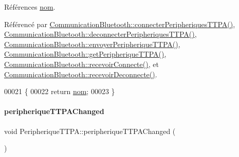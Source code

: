 Références \hyperlink{class_peripherique_t_t_p_a_afafe3566b4b5357819811218b9a4244f}{nom}.



Référencé par \hyperlink{class_communication_bluetooth_a321073d9dc26aad4b34ecf41a1dee8a4}{Communication\+Bluetooth\+::connecter\+Peripheriques\+T\+T\+P\+A()}, \hyperlink{class_communication_bluetooth_aacfffa47d72f3ab5ab554001d5f38fd1}{Communication\+Bluetooth\+::deconnecter\+Peripheriques\+T\+T\+P\+A()}, \hyperlink{class_communication_bluetooth_a73d95b841bf64a4463760435a41fc219}{Communication\+Bluetooth\+::envoyer\+Peripherique\+T\+T\+P\+A()}, \hyperlink{class_communication_bluetooth_a1baec10cc16afe1a87cbad635a82c323}{Communication\+Bluetooth\+::get\+Peripherique\+T\+T\+P\+A()}, \hyperlink{class_communication_bluetooth_aee7edc20fc1fdfd5a5a1c228c1319531}{Communication\+Bluetooth\+::recevoir\+Connecte()}, et \hyperlink{class_communication_bluetooth_af187cbc294befb656070f9817763104b}{Communication\+Bluetooth\+::recevoir\+Deconnecte()}.


\begin{DoxyCode}
00021 \{
00022     \textcolor{keywordflow}{return} \hyperlink{class_peripherique_t_t_p_a_afafe3566b4b5357819811218b9a4244f}{nom};
00023 \}
\end{DoxyCode}
\mbox{\label{class_peripherique_t_t_p_a_a5a0a18d25ab4c4b8362a80f215dbfc75}} 
\paragraph{\texorpdfstring{peripherique\+T\+T\+P\+A\+Changed}{peripheriqueTTPAChanged}}
{\footnotesize\ttfamily void Peripherique\+T\+T\+P\+A\+::peripherique\+T\+T\+P\+A\+Changed (\begin{DoxyParamCaption}{ }\end{DoxyParamCaption})\hspace{0.3cm}{\ttfamily [signal]}}

\mbox{\label{class_peripherique_t_t_p_a_aab23a43f5c9d70c30df3dbf4aeeeff9d}} 
